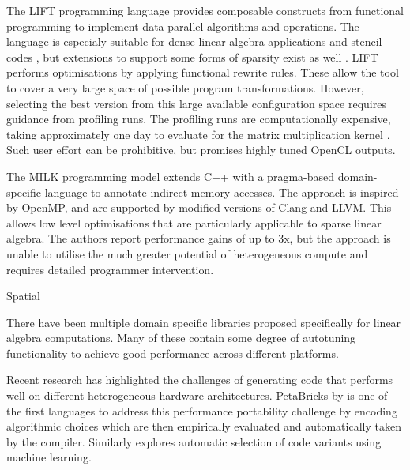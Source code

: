     The LIFT programming language \citep{steuwer15rewrite}
    provides composable constructs from functional programming to implement
    data-parallel algorithms and operations.
    The language is especialy suitable for dense linear algebra applications
    \citep{Steuwer:2016:MMB:2968455.2968521} and stencil codes
    \citep{Hagedorn:2018:HPS:3179541.3168824}, but extensions to support
    some forms of sparsity exist as well
    \citep{Pizzuti:2019:PAA:3331553.3342614}.
    LIFT performs optimisations by applying functional rewrite rules.
    These allow the tool to cover a very large space of possible program
    transformations.
    However, selecting the best version from this large available configuration
    space requires guidance from profiling runs.
    The profiling runs are computationally expensive, taking approximately
    one day to evaluate for the matrix multiplication kernel
    \citep{Steuwer:2016:MMB:2968455.2968521}.
    Such user effort can be prohibitive, but promises highly tuned OpenCL
    outputs.

    The MILK programming model \citep{Kiriansky:2016:OIM:2967938.2967948}
    extends C++ with a pragma-based domain-specific language to annotate
    indirect memory accesses.
    The approach is inspired by OpenMP, and are supported by modified versions
    of Clang and LLVM.
    This allows low level optimisations that are particularly applicable to
    sparse linear algebra.
    The authors report performance gains of up to 3x, but the approach is unable
    to utilise the much greater potential of heterogeneous compute and requires
    detailed programmer intervention.

    Spatial \citet{Koeplinger:2018:SLC:3192366.3192379}

    There have been multiple domain specific libraries proposed specifically
    for linear algebra computations.
    Many of these contain some degree of autotuning functionality to achieve
    good performance across different platforms.
    \citet{Spampinato:2016:BLA:2854038.2854060}

    Recent research has highlighted the challenges of generating code that
    performs well on different heterogeneous hardware architectures.
    PetaBricks by \citet{PhothilimthanaARA13} is one of the first languages to
    address this performance portability challenge by encoding algorithmic
    choices which are then empirically evaluated and automatically taken by the
    compiler.
    Similarly \cite{MuralidharanRHG16} explores automatic selection of code
    variants using machine learning.

